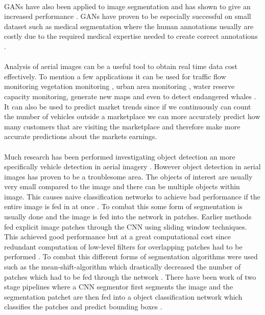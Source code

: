 \documentclass[a4paper,11pt]{article}
\begin{document}
\\
GANs have also been applied to image segmentation and has shown to give an increased performance \cite{luc_semantic_2016, souly_semi_2017}. GANs have proven to be especially successful on small dataset such as medical segmentation where the human annotations usually are costly due to the required medical expertise needed to create correct annotations \cite{souly_semi_2017, xue_segan:_2017-1, yang_automatic_2017-1, rezaei_conditional_2017-1, arbelle_microscopy_2017-1}.\\
\\
Analysis of aerial images can be a useful tool to obtain real time data cost effectively. To mention a few applications it can be used for traffic flow monitoring \cite{ruhe_traffic_2003, moranduzzo_automatic_2014} vegetation monitoring \cite{uto_characterization_2013, berni_thermal_2009}, urban area monitoring \cite{moranduzzo_lbp-based_2015}, water reserve capacity monitoring, generate new maps \cite{isola_image--image_2016} and even to detect endangered whales \cite{polzounov_right_2016}. It can also be used to predict market trends since if we continuously can count the number of vehicles outside a marketplace we can more accurately predict how many customers that are visiting the marketplace and therefore make more accurate predictions about the markets earnings.\\
\\
Much research has been performed investigating object detection an more specifically vehicle detection in aerial imagery \citep{ammour_deep_2017, holt_object-based_2009, audebert_segment-before-detect:_2017, razakarivony_vehicle_2015, zhong_robust_2017, audebert_usability_2016, sakla_deep_2017}. However object detection in aerial images has proven to be a troublesome area. The objects of interest are usually very small compared to the image and there can be multiple objects within image. This causes naive classification networks to achieve bad performance if the entire image is fed in at once \cite{ammour_deep_2017}. To combat this some form of segmentation is usually done and the image is fed into the network in patches. Earlier methods fed explicit image patches through the CNN using sliding window techniques\cite{holt_object-based_2009}. This achieved good performance but at a great computational cost since redundant computation of low-level filters for overlapping patches had to be performed \cite{luc_semantic_2016}. To combat this different forms of segmentation algorithms were used such as the mean-shift-algorithm which drastically decreased the number of patches which had to be fed through the network \cite{ammour_deep_2017}. There have been work of two stage pipelines where a CNN segmentor first segments the image and the segmentation patchet are then fed into a object classification network which classifies the patches and predict bounding boxes \cite{audebert_segment-before-detect:_2017}. \\
\end{document}
